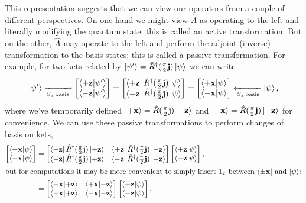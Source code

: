 \documentclass[../p116main.tex]{subfiles}
\begin{document}
This representation suggests that we can view our operators from a couple of different perspectives.
On one hand we might view $\hat A$ as operating to the left and literally modifying the quantum state; this is called an active transformation.
But on the other, $\hat A$ may operate to the left and perform the adjoint (inverse) transformation to the basis states; this is called a passive transformation.
For example, for two kets related by $\left| \psi' \right> = \hat R^\dagger (\frac{\pi}{2} \mathbf{j}) \left| \psi \right>$ we can write
\[ \left| \psi' \right> \xrightarrow[{S_z \,\textrm{basis}}]{} \begin{bmatrix} \left< +\mathbf{z} \middle| \psi' \right> \\ \left< -\mathbf{z} \middle| \psi' \right> \end{bmatrix} = \begin{bmatrix} \left< +\mathbf{z} \right| \hat R^\dagger (\frac{\pi}{2} \mathbf{j}) \left| \psi \right> \\ \left< -\mathbf{z} \right| \hat R^\dagger (\frac{\pi}{2} \mathbf{j}) \left| \psi \right> \end{bmatrix} = \begin{bmatrix} \left< +\mathbf{x} \middle| \psi \right> \\ \left< -\mathbf{x} \middle| \psi \right> \end{bmatrix} \xleftarrow[{S_z \,\textrm{basis}}]{} \left| \psi \right>, \]
where we've temporarily defined $\left| +\mathbf{x} \right> = \hat R (\frac{\pi}{2} \mathbf{j}) \left| +\mathbf{z} \right>$ and $\left| -\mathbf{x} \right> = \hat R (\frac{\pi}{2} \mathbf{j}) \left| -\mathbf{z} \right>$ for convenience.
We can use these passive transformations to perform changes of basis on kets,
\begin{align*}
    \begin{bmatrix} \left< +\mathbf{x} \middle| \psi \right> \\ \left< -\mathbf{x} \middle| \psi \right> \end{bmatrix} &= \begin{bmatrix} \left< +\mathbf{z} \right| \hat R^\dagger (\frac{\pi}{2} \mathbf{j}) \left| +\mathbf{z} \right> & \left< +\mathbf{z} \right| \hat R^\dagger (\frac{\pi}{2} \mathbf{j}) \left| -\mathbf{z} \right> \\ \left< -\mathbf{z} \right| \hat R^\dagger (\frac{\pi}{2} \mathbf{j}) \left| +\mathbf{z} \right> & \left< -\mathbf{z} \right| \hat R^\dagger (\frac{\pi}{2} \mathbf{j}) \left| -\mathbf{z} \right> \end{bmatrix} \begin{bmatrix} \left< +\mathbf{z} \middle| \psi \right> \\ \left< -\mathbf{z} \middle| \psi \right> \end{bmatrix}, \\
    \intertext{but for computations it may be more convenient to simply insert $1_x$ between $\left< \pm \mathbf{x} \right|$ and $\left| \psi \right>$:}
    &= \begin{bmatrix} \left< +\mathbf{x} \middle| +\mathbf{z} \right> & \left< +\mathbf{x} \middle| -\mathbf{z} \right> \\ \left< -\mathbf{x} \middle| +\mathbf{z} \right> & \left< -\mathbf{x} \middle| -\mathbf{z} \right> \end{bmatrix} \begin{bmatrix} \left< +\mathbf{z} \middle| \psi \right> \\ \left< -\mathbf{z} \middle| \psi \right> \end{bmatrix}.
\end{align*}
\end{document}
